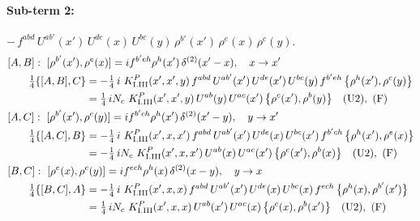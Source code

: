 \documentclass[10pt]{article}
\numberwithin{equation}{section}
\begin{document}
\paragraph{Sub-term 2:} $-\,f^{abd}\,U^{ab'}(x')\,U^{de}(x)\,U^{bc}(y)\,\rho^{b'}(x')\,\rho^{e}(x)\,\rho^{c}(y)$.
\begin{align}
&[A,B]:\ [\rho^{b'}(x'),\rho^{e}(x)]=i f^{b'eh}\rho^{h}(x')\,\delta^{(2)}(x'-x),\quad x\to x'\notag\\
&\qquad \tfrac14\{[A,B],C\}=-\tfrac14\,i\,\,K^{P}_{\rm I.III}(x',x',y)\,f^{abd}\,U^{ab'}(x')\,U^{de}(x')\,U^{bc}(y)\,f^{b'eh}\,\big\{\rho^{h}(x'),\rho^{c}(y)\big\}\notag\\
&\qquad\phantom{\tfrac14\{[A,B],C\}}=\tfrac14\,i N_{c}\,\,K^{P}_{\rm I.III}(x',x',y)\,U^{ab}(y)\,U^{ac}(x')\,\big\{\rho^{c}(x'),\rho^{b}(y)\big\}\quad\text{(U2)},\ \text{(F)}
\label{eq:GI.III.P-2-AB}\\
&[A,C]:\ [\rho^{b'}(x'),\rho^{c}(y)]=i f^{b'ch}\rho^{h}(x')\,\delta^{(2)}(x'-y),\quad y\to x'\notag\\
&\qquad \tfrac14\{[A,C],B\}=-\tfrac14\,i\,\,K^{P}_{\rm I.III}(x',x,x')\,f^{abd}\,U^{ab'}(x')\,U^{de}(x)\,U^{bc}(x')\,f^{b'ch}\,\big\{\rho^{h}(x'),\rho^{e}(x)\big\}\notag\\
&\qquad\phantom{\tfrac14\{[A,C],B\}}=-\tfrac14\,i N_{c}\,\,K^{P}_{\rm I.III}(x',x,x')\,U^{ab}(x)\,U^{ac}(x')\,\big\{\rho^{c}(x'),\rho^{b}(x)\big\}\quad\text{(U2)},\ \text{(F)}
\label{eq:GI.III.P-2-AC}\\
&[B,C]:\ [\rho^{e}(x),\rho^{c}(y)]=i f^{ech}\rho^{h}(x)\,\delta^{(2)}(x-y),\quad y\to x\notag\\
&\qquad \tfrac14\{[B,C],A\}=-\tfrac14\,i\,\,K^{P}_{\rm I.III}(x',x,x)\,f^{abd}\,U^{ab'}(x')\,U^{de}(x)\,U^{bc}(x)\,f^{ech}\,\big\{\rho^{h}(x),\rho^{b'}(x')\big\}\notag\\
&\qquad\phantom{\tfrac14\{[B,C],A\}}=\tfrac14\,i N_{c}\,\,K^{P}_{\rm I.III}(x',x,x)\,U^{ab}(x')\,U^{ac}(x)\,\big\{\rho^{c}(x),\rho^{b}(x')\big\}\quad\text{(U2)},\ \text{(F)}
\label{eq:GI.III.P-2-BC}
\end{align}
\end{document}
